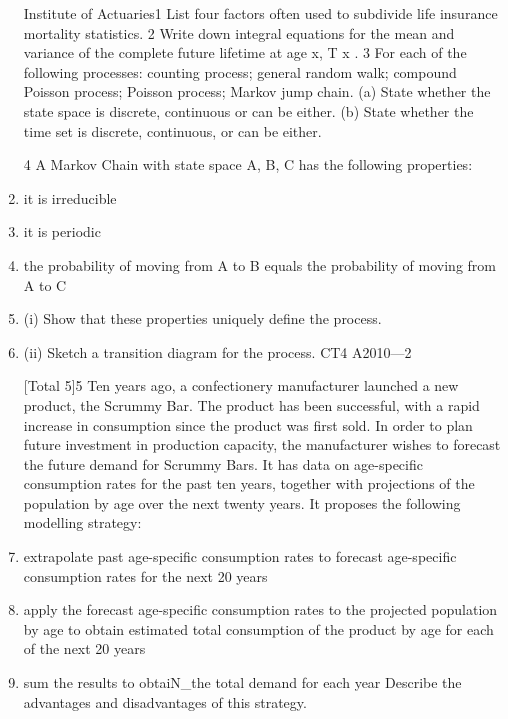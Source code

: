 \documentclass[a4paper,12pt]{article}
\begin{document}
\begin{enumerate}
 Institute of Actuaries1 List four factors often used to subdivide life insurance mortality statistics.  
2 Write down integral equations for the mean and variance of the complete future
lifetime at age x, T x .  
3
For each of the following processes:
counting process;
general random walk;
compound Poisson process;
Poisson process;
Markov jump chain.
(a) State whether the state space is discrete, continuous or can be either.
(b) State whether the time set is discrete, continuous, or can be either.
 
4
A Markov Chain with state space {A, B, C} has the following properties:
\item it is irreducible
\item it is periodic
\item the probability of moving from A to B equals the probability of moving from A
to C
\item (i) Show that these properties uniquely define the process.
\item (ii) Sketch a transition diagram for the process.
CT4 A2010—2

 
[Total 5]5
Ten years ago, a confectionery manufacturer launched a new product, the Scrummy
Bar. The product has been successful, with a rapid increase in consumption since the product was first sold. In order to plan future investment in production capacity, the
manufacturer wishes to forecast the future demand for Scrummy Bars. It has data on age-specific consumption rates for the past ten years, together with projections of the
population by age over the next twenty years. It proposes the following modelling strategy:
\item extrapolate past age-specific consumption rates to forecast age-specific consumption rates for the next 20 years
\item apply the forecast age-specific consumption rates to the projected population by
age to obtain estimated total consumption of the product by age for each of the
next 20 years
\item sum the results to obtaiN_the total demand for each year
Describe the advantages and disadvantages of this strategy.

\newpage


\end{enumerate}
\end{document}
